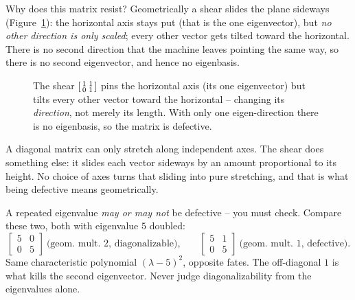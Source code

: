 Why does this matrix resist? Geometrically a shear slides the plane sideways
(Figure~\ref{ch24:fig-shear}): the horizontal axis stays put (that is the one
eigenvector), but \emph{no other direction is only scaled}; every other vector
gets tilted toward the horizontal. There is no second direction that the
machine leaves pointing the same way, so there is no second eigenvector, and
hence no eigenbasis.

\begin{figure}[H]
\centering
{}
\caption{The shear $\protect\begin{bsmallmatrix}1&1\\0&1\protect\end{bsmallmatrix}$ pins
the horizontal axis (its one eigenvector) but tilts every other vector toward the
horizontal -- changing its \emph{direction}, not merely its length. With only one
eigen-direction there is no eigenbasis, so the matrix is defective.}
\label{ch24:fig-shear}
\end{figure}

\begin{intuitionbox}
A diagonal matrix can only stretch along independent axes. The shear does
something else: it slides each vector sideways by an amount proportional to its
height. No choice of axes turns that sliding into pure stretching, and that is
what being defective means geometrically.
\end{intuitionbox}

\begin{trapbox}
A repeated eigenvalue \emph{may or may not} be defective -- you must check.
Compare these two, both with eigenvalue $5$ doubled:
\[
  \begin{bmatrix} 5 & 0 \\ 0 & 5 \end{bmatrix}
  \ \text{(geom.\ mult.\ }2\text{, diagonalizable),}
  \qquad
  \begin{bmatrix} 5 & 1 \\ 0 & 5 \end{bmatrix}
  \ \text{(geom.\ mult.\ }1\text{, defective).}
\]
Same characteristic polynomial $(\lambda-5)^2$, opposite fates. The off-diagonal
$1$ is what kills the second eigenvector. Never judge diagonalizability from the
eigenvalues alone.
\end{trapbox}

